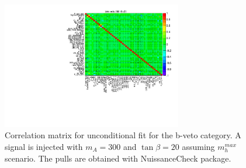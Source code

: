 \begin{figure}[!hb]
  \centering
  \includegraphics[width=0.7\textwidth]{figure/limits/matrix_300.pdf}
  \caption{Correlation matrix for unconditional fit for the b-veto category. A signal is injected with 
	$m_A=300$ and  $\tan\beta=20$ assuming $m_h^{max}$ scenario. The pulls are obtained with NuissanceCheck package.  }

\end{figure}


\clearpage
